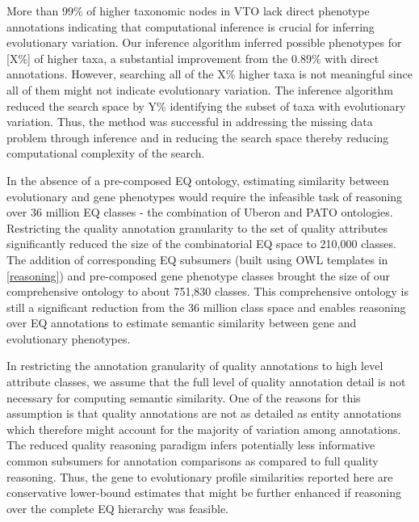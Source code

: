 \documentclass{article}
\begin{document}


More than 99\% of higher taxonomic nodes in VTO lack direct phenotype annotations indicating that computational inference is crucial for inferring evolutionary variation. Our inference algorithm inferred possible phenotypes for [X\%] of higher taxa, a substantial improvement from the 0.89\% with direct annotations. However, searching all of the X\% higher taxa is not meaningful since all of them might not indicate evolutionary variation. The inference algorithm reduced the search space by Y\% identifying the subset of taxa with evolutionary variation. Thus, the method was successful in addressing the missing data problem through inference and in reducing the search space thereby reducing computational complexity of the search.

In the absence of a pre-composed EQ ontology, estimating similarity between evolutionary and gene phenotypes would require the infeasible task of reasoning over 36 million EQ classes - the combination of Uberon and PATO ontologies. Restricting the quality annotation granularity to the set of quality attributes significantly reduced the size of the combinatorial EQ space to 210,000 classes. The addition of corresponding EQ subsumers (built using OWL templates in \ref{reasoning}) and pre-composed gene phenotype classes brought the size of our comprehensive ontology to about 751,830 classes. This comprehensive ontology is still a significant reduction from the 36 million class space and enables reasoning over EQ annotations to estimate semantic similarity between gene and evolutionary phenotypes. 


In restricting the annotation granularity of quality annotations to high level attribute classes, we assume that the full level of quality annotation detail is not necessary for computing semantic similarity. One of the reasons for this assumption is that quality annotations are not as detailed as entity annotations which therefore might account for the majority of variation among annotations. The reduced quality reasoning paradigm infers potentially less informative common subsumers for annotation comparisons as compared to full quality reasoning. Thus, the gene to evolutionary profile similarities reported here are conservative lower-bound estimates that might be further enhanced if reasoning over the complete EQ hierarchy was feasible.
 
\end{document}
